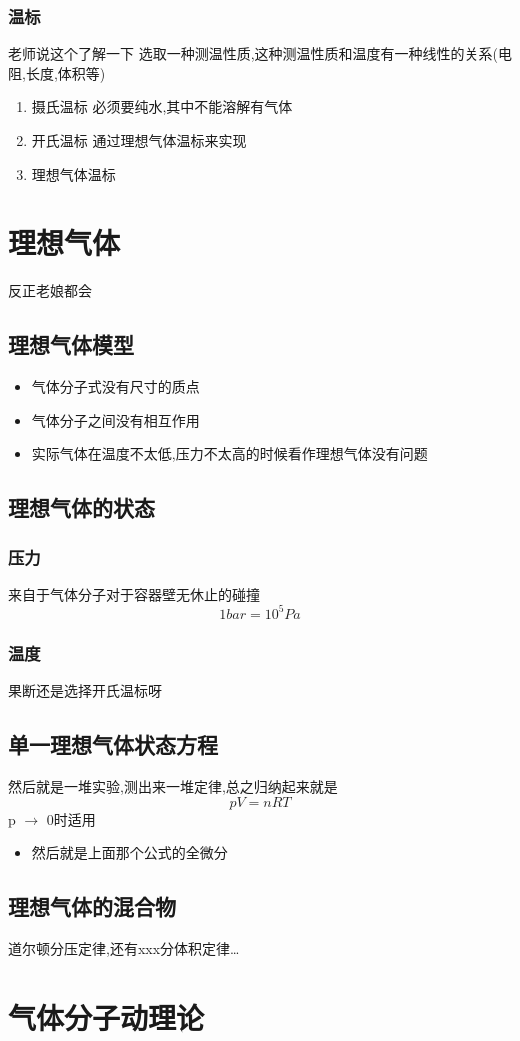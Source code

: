 \documentclass[11pt]{article}
\begin{document}
\subsubsection{温标}
\label{sec:org87f5213}
老师说这个了解一下
选取一种测温性质,这种测温性质和温度有一种线性的关系(电阻,长度,体积等)
\begin{enumerate}
\item 摄氏温标
\label{sec:org6af1b43}
必须要纯水,其中不能溶解有气体
\item 开氏温标
\label{sec:org9dd3fe3}
通过理想气体温标来实现

\item 理想气体温标
\label{sec:org7e1ae46}
\end{enumerate}

\section{理想气体}
\label{sec:orgcd99f5c}
反正老娘都会
\subsection{理想气体模型}
\label{sec:org23c9aed}
\begin{itemize}
\item 气体分子式没有尺寸的质点
\item 气体分子之间没有相互作用
\item 实际气体在温度不太低,压力不太高的时候看作理想气体没有问题
\end{itemize}
\subsection{理想气体的状态}
\label{sec:orge66d3c3}
\subsubsection{压力}
\label{sec:orga867b81}
来自于气体分子对于容器壁无休止的碰撞
\[
1 bar = 10^5 Pa
\]
\subsubsection{温度}
\label{sec:orgae26445}
果断还是选择开氏温标呀
\subsection{单一理想气体状态方程}
\label{sec:org554835e}
然后就是一堆实验,测出来一堆定律,总之归纳起来就是
\[
pV=nRT
\]
p \(\to\) 0时适用
\begin{itemize}
\item 然后就是上面那个公式的全微分
\end{itemize}
\subsection{理想气体的混合物}
\label{sec:orgc00bbda}
道尔顿分压定律,还有xxx分体积定律\ldots{}
\section{气体分子动理论}
\label{sec:org106508e}
\begin{quote}

\end{quote}
\end{document}
